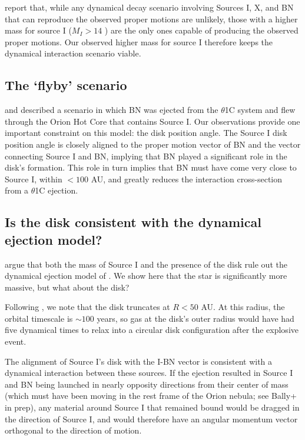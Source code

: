 \documentclass[twocolumn]{aastex61}
\begin{document}
\citet{Farias2017a} report that, while any dynamical decay scenario involving
Sources I, X, and BN that can reproduce the observed proper motions are
unlikely, those with a higher mass for source I ($M_I>14$ \msun) are the only
ones capable of producing the observed proper motions.  Our observed higher
mass for source I therefore keeps the dynamical interaction scenario viable.

\subsection{The `flyby' scenario}
\citet{Tan2004a} and \citet{Chatterjee2012a} described a scenario in which BN
was ejected from the $\theta$1C system and flew through the Orion Hot Core that
contains Source I.   Our observations provide one important constraint on this model:
the disk position angle.
The Source I disk position angle is  closely aligned to the proper
motion vector of BN and the vector connecting Source I and BN,
implying that BN played a significant role in the disk's formation.
This role in turn implies that BN must have come very close to Source I,
within $<100$ AU, and greatly reduces the interaction cross-section
from a $\theta$1C ejection.


\subsection{Is the disk consistent with the dynamical ejection model?}
\citet{Plambeck2016a} argue that both the mass of Source I and the presence of
the disk rule out the dynamical ejection model of \citet{Bally2011a}.  We show
here that the star is significantly more massive, but what about the disk?

Following \citet{Bally2011a}, we note that the disk truncates at $R<50$
AU.  At this radius, the orbital timescale is $\sim100$ years, so gas at the
disk's outer radius would have had five dynamical times to relax into a
circular disk configuration after the explosive event.

The alignment of Source I's disk with the I-BN vector is consistent with
a dynamical interaction between these sources.  If the ejection resulted
in Source I and BN being launched in nearly opposity directions from their
center of mass (which must have been moving in the rest frame of the Orion
nebula; see Bally+ in prep), any material around Source I that remained
bound would be dragged in the direction of Source I, and would therefore
have an angular momentum vector orthogonal to the direction of motion.
\end{document}
